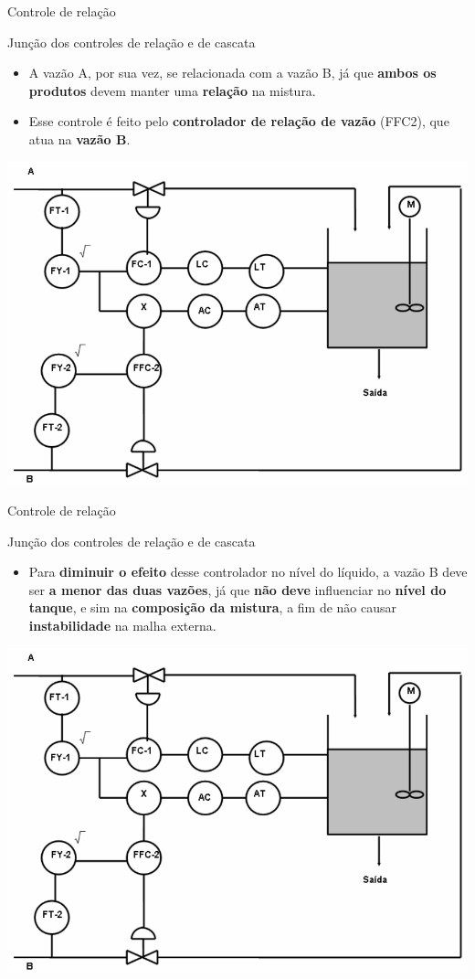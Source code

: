 \begin{frame}{Controle de relação}
	\begin{block}{Junção dos controles de relação e de cascata}
		\begin{itemize}
			\item A vazão A, por sua vez, se relacionada com a vazão B, já que \textbf{ambos os produtos} devem manter uma \textbf{relação} na mistura.
			\item Esse controle é feito pelo \textbf{controlador de relação de vazão} (FFC2), que atua na \textbf{vazão B}.
		\end{itemize}
	\end{block}
	
	\centering
	\includegraphics[width=0.55\linewidth]{Figuras/Ch15/fig9}
\end{frame}


\begin{frame}{Controle de relação}
	\begin{block}{Junção dos controles de relação e de cascata}
		\begin{itemize}
			\item Para \textbf{diminuir o efeito} desse controlador no nível do líquido, a vazão B deve ser \textbf{a menor das duas vazões}, já que \textbf{não deve} influenciar no \textbf{nível do tanque}, e sim na \textbf{composição da mistura}, a fim de não causar \textbf{instabilidade} na malha externa.
		\end{itemize}
	\end{block}
	
	\centering
	\includegraphics[width=0.55\linewidth]{Figuras/Ch15/fig9}
\end{frame}


